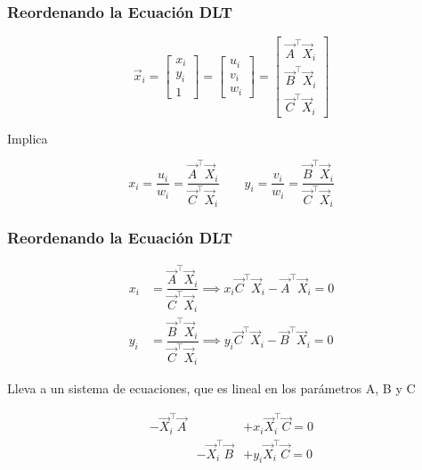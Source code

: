 \begin{frame}
  \frametitle{Reordenando la Ecuación DLT}

  \begin{equation*}
    \vec{x}_{i} =
    \begin{bmatrix}
      x_{i} \\
      y_{i} \\
      1
    \end{bmatrix} =
    \begin{bmatrix}
      u_{i} \\
      v_{i} \\
      w_{i}
    \end{bmatrix} = 
    \begin{bmatrix}
      \vec{A}^{\top}\vec{X}_{i} \\
      \vec{B}^{\top}\vec{X}_{i} \\
      \vec{C}^{\top}\vec{X}_{i}
    \end{bmatrix}
  \end{equation*}

Implica

  \begin{equation*}
    x_{i} = \dfrac{u_{i}}{w_{i}} = \dfrac{\vec{A}^{\top}\vec{X}_{i}}{\vec{C}^{\top}\vec{X}_{i}}
    \quad \quad
    y_{i} = \dfrac{v_{i}}{w_{i}} = \dfrac{\vec{B}^{\top}\vec{X}_{i}}{\vec{C}^{\top}\vec{X}_{i}}
  \end{equation*}

\end{frame}

\begin{frame}
  \frametitle{Reordenando la Ecuación DLT}

  \begin{align*}
    x_{i} &= \dfrac{\vec{A}^{\top}\vec{X}_{i}}{\vec{C}^{\top}\vec{X}_{i}} \implies x_{i} \vec{C}^{\top}\vec{X}_{i} - \vec{A}^{\top}\vec{X}_{i} = 0\\
    y_{i} &= \dfrac{\vec{B}^{\top}\vec{X}_{i}}{\vec{C}^{\top}\vec{X}_{i}} \implies y_{i} \vec{C}^{\top}\vec{X}_{i} - \vec{B}^{\top}\vec{X}_{i} = 0
  \end{align*}

  Lleva a un sistema de ecuaciones, que es lineal en los parámetros A, B y C

  \begin{equation*}
    \begin{matrix}
      -\vec{X}_{i}^{\top}\vec{A}& &+x_{i}\vec{X}_{i}^{\top}\vec{C} = 0 \\
      &-\vec{X}_{i}^{\top}\vec{B} &+y_{i}\vec{X}_{i}^{\top}\vec{C} = 0
    \end{matrix}  
  \end{equation*}

\end{frame}

